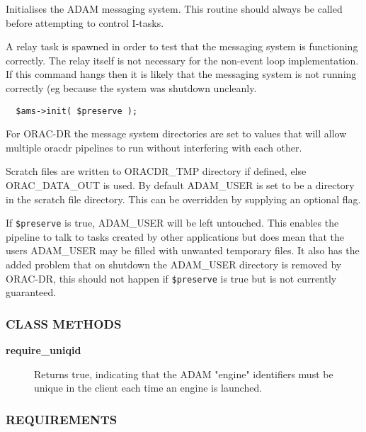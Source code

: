 \begin{description}
\begin{description}
Initialises the ADAM messaging system. This routine should always be
called before attempting to control I-tasks.



A relay task is spawned in order to test that the messaging system
is functioning correctly. The relay itself is not necessary for the
non-event loop implementation. If this command hangs then it is
likely that the messaging system is not running correctly (eg
because the system was shutdown uncleanly.

\begin{verbatim}
  $ams->init( $preserve );
\end{verbatim}


For ORAC-DR the message system directories are set to
values that will allow multiple oracdr pipelines to run
without interfering with each other.



Scratch files are written to ORACDR\_TMP directory if defined,
else ORAC\_DATA\_OUT is used. By default ADAM\_USER is set
to be a directory in the scratch file directory. This can be
overridden by supplying an optional flag.



If \texttt{\$preserve} is true, ADAM\_USER will be left untouched. This
enables the pipeline to talk to tasks created by other applications
but does mean that the users ADAM\_USER may be filled with unwanted
temporary files. It also has the added problem that on shutdown
the ADAM\_USER directory is removed by ORAC-DR, this should not happen
if \texttt{\$preserve} is true but is not currently guaranteed.

\end{description}
\subsubsection*{CLASS METHODS\label{ORAC::Msg::Control::AMS_CLASS_METHODS}}
\begin{description}

\item[{\textbf{require\_uniqid}}] \mbox{}

Returns true, indicating that the ADAM "engine" identifiers must
be unique in the client each time an engine is launched.

\end{description}
\subsubsection*{REQUIREMENTS\label{ORAC::Msg::Control::AMS_REQUIREMENTS}}



\end{description}

